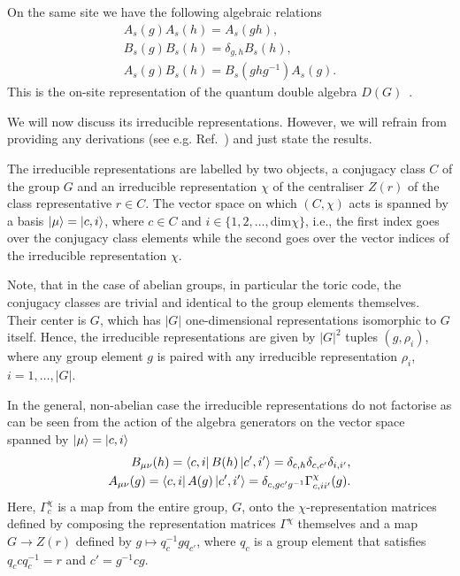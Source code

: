 \documentclass[a4paper,twocolumn,11pt, accepted=2024-06-14]{quantumarticle}
\begin{document}
On the same site we have the following algebraic relations 
\begin{equation}
    \begin{split}
        A_s{(g)}A_s{(h)} = A_s{(gh)}, \\
        B_s{(g)}B_s{(h)} = \delta_{g,h} B_s{(h)},\\
        A_s{(g)}B_s{(h)} = B_s{(ghg^{-1})}A_s{(g)}.
    \end{split}\label{eqn:alg}
\end{equation}
This is the on-site representation of the quantum double algebra $D(G)$~\cite{cui2018topological, Kitaev_2003}. 



We will now discuss its irreducible representations. However, we will refrain from providing any derivations (see e.g. Ref.~\cite{Cui_2015}) and just state the results. 

The irreducible representations are labelled by two objects, a conjugacy class $C$ of the group $G$ and an irreducible representation $\chi$ of the centraliser $Z(r)$ of the class representative $r \in C$. The vector space on which $(C, \chi)$ acts is spanned by a basis $\ket{\mu} = \ket{c, i}$, where $c \in C$ and $i \in \{1, 2, \ldots, \text{dim}\chi\}$, i.e., the first index goes over the conjugacy class elements while the second goes over the vector indices of the irreducible representation $\chi$.

Note, that in the case of abelian groups, in particular the toric code, the conjugacy classes are trivial and identical to the group elements themselves. Their center is $G$, which has $|G|$ one-dimensional representations isomorphic to $G$ itself. Hence, the irreducible representations are given by $|G|^2$ tuples $(g,\rho_i)$, where any group element $g$ is paired with any irreducible representation $\rho_i$, $i=1,\ldots, |G|$.

In the general, non-abelian case the irreducible representations do not factorise as can be seen from the action of the algebra generators on the vector space spanned by $\ket{\mu}=\ket{c,i}$ %
\begin{equation}
    \begin{split}
        B_{\mu\nu}{(h)}=\bra{c, i} B{(h)} \ket{c', i'} = \delta_{c, h} \delta_{c, c'}\delta_{i, i'}, \\
        A_{\mu\nu}{(g)}= \bra{c, i} A{(g)} \ket{c', i'} = \delta_{c,gc'g^{-1}} \Gamma^\chi_{c,ii'}(g).
    \end{split}
\end{equation}
Here, $\Gamma^\chi_c$ is a map from the entire group, $G$, onto the $\chi$-representation matrices defined by composing the representation matrices $\Gamma^\chi$ themselves and a map $G\to Z(r)$ defined by $g \mapsto q_{c}^{-1}gq_{c'}$, where $q_c$ is a group element that satisfies $q_c c q_c^{-1} = r$ and $c'=g^{-1}cg$.
\end{document}
